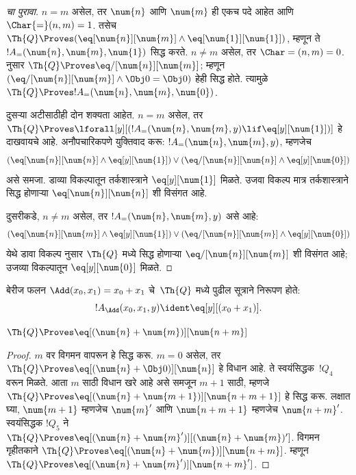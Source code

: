 \documentclass[../../../include/open-logic-section]{subfiles}
\begin{document}
\begin{proof}[ चा पुरावा]
$n = m$ असेल, तर $\num{n}$ आणि $\num{m}$ ही एकच पदे आहेत
आणि $\Char{=}(n, m) = 1$. तसेच $\Th{Q} \Proves (\eq[\num{n}][\num{m}] \land
\eq[\num{1}][\num{1}])$, म्हणून ते $!A_=(\num{n}, \num{m},
\num{1})$ सिद्ध करते. $n \neq m$ असेल, तर $\Char=(n, m) = 0$.
 नुसार $\Th{Q} \Proves \eq/[\num{n}][\num{m}]$;
म्हणून $(\eq/[\num{n}][\num{m}] \land \Obj 0 = \Obj 0)$
हेही सिद्ध होते. त्यामुळे $\Th{Q}
\Proves !A_=(\num{n}, \num{m}, \num{0})$.

दुसऱ्या अटीसाठीही दोन शक्यता आहेत. $n = m$ असेल, तर
$\Th{Q} \Proves \lforall[y][(!A_=(\num{n}, \num{m}, y)
  \lif \eq[y][\num{1}])]$ हे दाखवायचे आहे. अनौपचारिकपणे
युक्तिवाद करू: $!A_=(\num{n}, \num{m}, y)$, म्हणजेच
\[
(\eq[\num{n}][\num{n}] \land \eq[y][\num{1}]) \lor
(\eq/[\num{n}][\num{n}] \land \eq[y][\num{0}])
\]
असे समजा. डाव्या विकल्पातून तर्कशास्त्राने
$\eq[y][\num{1}]$ मिळते. उजवा विकल्प मात्र
तर्कशास्त्राने सिद्ध होणाऱ्या $\eq[\num{n}][\num{n}]$
शी विसंगत आहे.

दुसरीकडे, $n \neq m$ असेल, तर $!A_=(\num{n},
\num{m}, y)$ असे आहे:
\[
(\eq[\num{n}][\num{m}] \land \eq[y][\num{1}]) \lor
(\eq/[\num{n}][\num{m}] \land \eq[y][\num{0}])
\]
येथे डावा विकल्प  नुसार
$\Th{Q}$ मध्ये सिद्ध होणाऱ्या $\eq/[\num{n}][\num{m}]$
शी विसंगत आहे; उजव्या विकल्पातून $\eq[y][\num{0}]$ मिळते.
\end{proof}

\begin{prop}
बेरीज फलन $\Add(x_0, x_1) = x_0+x_1$ चे~$\Th{Q}$ मध्ये
पुढील सूत्राने निरूपण होते:
\[
  !A_{\Add}(x_0, x_1, y) \ident \eq[y][(x_0 + x_1)].
\]
\end{prop}

\begin{lem}
$\Th{Q} \Proves \eq[(\num{n} + \num{m})][\num{n+m}]$
\end{lem}

\begin{proof}
$m$ वर विगमन वापरून हे सिद्ध करू. $m = 0$ असेल, तर
$\Th{Q} \Proves \eq[(\num{n} + \Obj 0)][\num{n}]$
हे विधान आहे. ते स्वयंसिद्धक~$!Q_4$ वरून मिळते. आता
$m$ साठी विधान खरे आहे असे समजून $m+1$ साठी, म्हणजे
$\Th{Q} \Proves \eq[(\num{n} +
  \num{m+1})][\num{n+m+1}]$ हे सिद्ध करू. लक्षात घ्या,
$\num{m+1}$ म्हणजेच $\num{m}'$ आणि $\num{n+m+1}$ म्हणजेच
$\num{n+m}'$. स्वयंसिद्धक $!Q_5$ ने $\Th{Q}
\Proves \eq[(\num{n} + \num{m}')][(\num{n}+\num{m})']$.
विगमन गृहीतकाने $\Th{Q} \Proves \eq[(\num{n} + \num{m})][\num{n+m}]$.
म्हणून $\Th{Q} \Proves \eq[(\num{n} + \num{m}')][\num{n+m}']$.
\end{proof}
\end{document}
